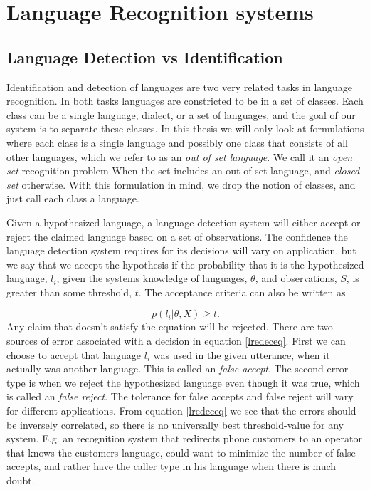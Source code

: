 \chapter{Language Recognition systems}

\section{Language Detection vs Identification}
\label{sect:detvsid}

Identification and detection of languages are two very related tasks in language recognition. In both tasks languages are constricted to be in a set of classes. Each class can be a single language, dialect, or a set of languages, and the goal of our system is to separate these classes. In this thesis we will only look at formulations where each class is a single language and possibly one class that consists of all other languages, which we refer to as an \emph{out of set language}. We call it an \emph{open set} recognition problem When the set includes an out of set language, and \emph{closed set} otherwise. With this formulation in mind, we drop the notion of classes, and just call each class a language. 

Given a hypothesized language, a language detection system will either accept or reject the claimed language based on a set of observations. The confidence the language detection system requires for its decisions will vary on application, but we say that we accept the hypothesis if the probability that it is the hypothesized language, $l_i$, given the systems knowledge of languages, $\theta$, and observations, $S$, is greater than some threshold, $t$. The acceptance criteria can also be written as

\begin{equation}
\label{lredeceq}
p(l_i | \theta, X) \geq t.
\end{equation}
Any claim that doesn't satisfy the equation will be rejected. There are two sources of error associated with a decision in equation \ref{lredeceq}. First we can choose to accept that language $l_i$ was used in the given utterance, when it actually was another language. This is called an \emph{false accept}. The second error type is when we reject the hypothesized language even though it  was true, which is called an  \emph{false reject}. The tolerance for false accepts and false reject will vary for different applications. From equation \ref{lredeceq} we see that the errors should be inversely correlated, so there is no universally best threshold-value for any system. E.g. an recognition system that redirects phone customers to an operator that knows the customers language, could want to minimize the number of false accepts, and rather have the caller type in his language when there is much doubt.

